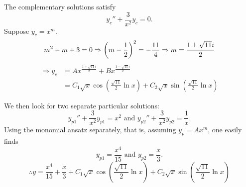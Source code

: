 \item
The complementary solutions satisfy
\[
	y_{c}'' + \frac{3}{x^2} y_c = 0.
\]
Suppose $y_c = x^m$.
\[
	m^2 - m  + 3 = 0
	\Rightarrow {\left( m - \frac{1}{2}\right)}^2 = -\frac{11}{4}
	\Rightarrow m = \frac{1 \pm \sqrt{11}i}{2}
\]
\begin{align*}
	\Rightarrow y_c
	 & = A x^{\frac{1 + \sqrt{11}i}{2}} + B x^{\frac{1 - \sqrt{11}i}{2}} \\
	 & = C_1 \sqrt{x} \cos \left( \frac{\sqrt{11}}{2} \ln x \right)
	+ C_2 \sqrt{x} \sin \left( \frac{\sqrt{11}}{2} \ln x \right)
\end{align*}

We then look for two separate particular solutions:
\[
	y_{p1}'' + \frac{3}{x^2} y_{p1} = x^2
	\text{ and }
	y_{p2}'' + \frac{3}{x^2} y_{p2} = \frac{1}{x}.
\]
Using the monomial ansatz separately, that is, assuming $y_p = Ax^m$, one easily finds
\[
	y_{p1} = \frac{x^4}{15}
	\text{ and }
	y_{p2} = \frac{x}{3}.
\]
\[
	\therefore y = \frac{x^4}{15} + \frac{x}{3}
	+ C_1 \sqrt{x} \cos \left( \frac{\sqrt{11}}{2} \ln x \right)
	+ C_2 \sqrt{x} \sin \left( \frac{\sqrt{11}}{2} \ln x \right)
\]
